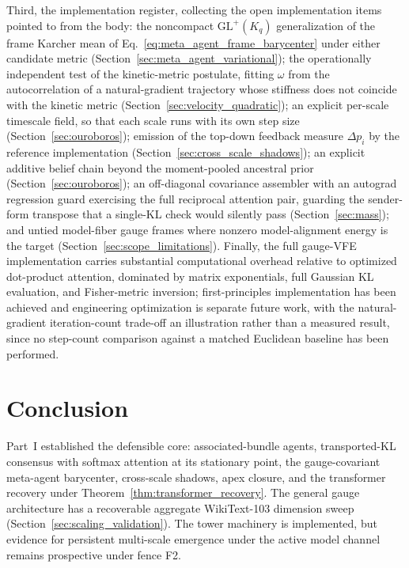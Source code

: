 \documentclass[11pt]{article}
\begin{document}
Third, the implementation register, collecting the open implementation items pointed to from the body: the noncompact $\mathrm{GL}^+(K_q)$ generalization of the frame Karcher mean of Eq.~\eqref{eq:meta_agent_frame_barycenter} under either candidate metric (Section~\ref{sec:meta_agent_variational}); the operationally independent test of the kinetic-metric postulate, fitting $\omega$ from the autocorrelation of a natural-gradient trajectory whose stiffness does not coincide with the kinetic metric (Section~\ref{sec:velocity_quadratic}); an explicit per-scale timescale field, so that each scale runs with its own step size (Section~\ref{sec:ouroboros}); emission of the top-down feedback measure $\Delta p_i$ by the reference implementation (Section~\ref{sec:cross_scale_shadows}); an explicit additive belief chain beyond the moment-pooled ancestral prior (Section~\ref{sec:ouroboros}); an off-diagonal covariance assembler with an autograd regression guard exercising the full reciprocal attention pair, guarding the sender-form transpose that a single-KL check would silently pass (Section~\ref{sec:mass}); and untied model-fiber gauge frames where nonzero model-alignment energy is the target (Section~\ref{sec:scope_limitations}). Finally, the full gauge-VFE implementation carries substantial computational overhead relative to optimized dot-product attention, dominated by matrix exponentials, full Gaussian KL evaluation, and Fisher-metric inversion; first-principles implementation has been achieved and engineering optimization is separate future work, with the natural-gradient iteration-count trade-off an illustration rather than a measured result, since no step-count comparison against a matched Euclidean baseline has been performed.

\section{Conclusion}\label{sec:global_conclusion}

Part~I established the defensible core: associated-bundle agents, transported-KL consensus with softmax attention at its stationary point, the gauge-covariant meta-agent barycenter, cross-scale shadows, apex closure, and the transformer recovery under Theorem~\ref{thm:transformer_recovery}. The general gauge architecture has a recoverable aggregate WikiText-103 dimension sweep (Section~\ref{sec:scaling_validation}). The tower machinery is implemented, but evidence for persistent multi-scale emergence under the active model channel remains prospective under fence F2.
\end{document}
